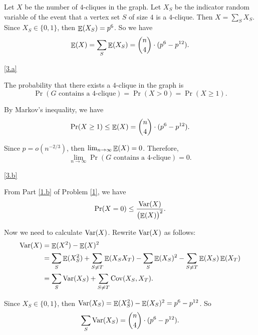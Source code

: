 \documentclass{homework}
\begin{document}
\begin{solution}

  Let $X$ be the number of $4$-cliques in the graph. Let $X_S$ be
  the indicator random variable of the event that
  a vertex set $S$ of size $4$ is a $4$-clique.
  Then $X = \sum_{S} X_S$. Since $X_S \in \{0, 1\}$, then $\mathop{\mathbb{E}}\displaylimits(X_S) = p^6$.
  So we have
  \begin{equation*}
    \mathop{\mathbb{E}}\displaylimits(X) = \sum_{S} \mathop{\mathbb{E}}\displaylimits(X_S) = \binom{n}{4} \cdot (p^6 - p^{12}).
  \end{equation*}

  \ref{3.a}

  The probability that there exists a $4$-clique in the graph is
  \begin{equation*}
    \Pr(G \text{ contains a $4$-clique}) = \Pr(X > 0) = \Pr(X \ge 1).
  \end{equation*}

  By Markov's inequality, we have
  \begin{equation*}
    \Pr(X \ge 1) \le \mathop{\mathbb{E}}\displaylimits(X) = \binom{n}{4} \cdot (p^6 - p^{12}).
  \end{equation*}

  Since $p = o(n^{-2/3})$, then $\lim_{n \to \infty}\mathop{\mathbb{E}}\displaylimits(X) = 0$. Therefore,
  \begin{equation*}
    \lim_{n \to \infty} \Pr(G \text{ contains a $4$-clique}) = 0.
  \end{equation*}

  \ref{3.b}

  From Part \ref{1.b} of Problem \ref{1}, we have
  \begin{equation*}
    \Pr(X = 0) \le \frac{\mathop{\mathrm{Var}}\displaylimits(X)}{{\bigl(\mathop{\mathbb{E}}\displaylimits(X)\bigr)}^{2}}.
  \end{equation*}

  Now we need to calculate $\mathop{\mathrm{Var}}\displaylimits(X)$. Rewrite $\mathop{\mathrm{Var}}\displaylimits(X)$ as follows:
  \begin{align*}
    \mathop{\mathrm{Var}}\displaylimits(X) & = \mathop{\mathbb{E}}\displaylimits(X^2) - \mathop{\mathbb{E}}\displaylimits(X)^2 \\
    & = \sum_{S}\mathop{\mathbb{E}}\displaylimits(X_S^2) + \sum_{S \neq T}\mathop{\mathbb{E}}\displaylimits(X_SX_T) - \sum_S \mathop{\mathbb{E}}\displaylimits(X_S)^2 - \sum_{S \neq T}\mathop{\mathbb{E}}\displaylimits(X_S)\mathop{\mathbb{E}}\displaylimits(X_T) \\
    & = \sum_{S}\mathop{\mathrm{Var}}\displaylimits(X_S) + \sum_{S \neq T}\text{Cov}(X_S, X_T).
  \end{align*}

  Since $X_S \in \{0, 1\}$, then $\mathop{\mathrm{Var}}\displaylimits(X_S) = \mathop{\mathbb{E}}\displaylimits(X_S^2) - \mathop{\mathbb{E}}\displaylimits(X_S)^2 = p^6 - p^{12}$.
  So
  \begin{equation*}
    \sum_{S}\mathop{\mathrm{Var}}\displaylimits(X_S) = \binom{n}{4} \cdot (p^6 - p^{12}).
  \end{equation*}


\end{solution}
\end{document}
